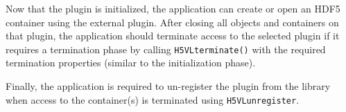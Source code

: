 Now that the plugin is initialized, the application can create or open an HDF5 container using the external plugin. After closing all objects and containers on that plugin, the application should terminate access to the selected plugin if it requires a termination phase by calling {\tt H5VLterminate()} with the required termination properties (similar to the initialization phase). 

Finally, the application is required to un-register the plugin from the library when access to the container(s) is terminated using {\tt H5VLunregister}.


